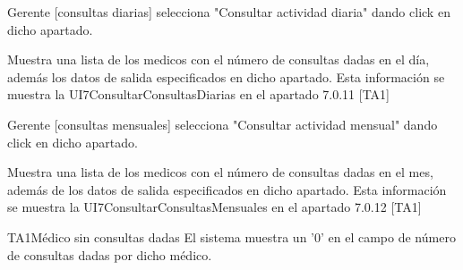 \begin{UCtrayectoria}{Gerente  [consultas diarias]}
        \UCpaso[\UCactor] selecciona "Consultar actividad diaria" dando click en dicho apartado.
        
        \UCpaso Muestra una lista de los medicos con el número de consultas dadas en el día, además los datos de salida especificados en dicho apartado. Esta información se muestra la UI7ConsultarConsultasDiarias   en el apartado 7.0.11 [TA1]

\end{UCtrayectoria}

\begin{UCtrayectoria}{Gerente  [consultas mensuales]}
        \UCpaso[\UCactor] selecciona "Consultar actividad mensual" dando click en dicho apartado.
        
        \UCpaso Muestra una lista de los medicos con el número de consultas dadas en el mes, además de los datos de salida especificados en dicho apartado. Esta información se muestra  la UI7ConsultarConsultasMensuales en el apartado 7.0.12 [TA1]

\end{UCtrayectoria}

\begin{UCtrayectoriaA}{TA1}{Médico sin consultas dadas}
    \UCpaso El sistema muestra un '0' en el campo de número de consultas dadas por dicho médico.
    
   \end{UCtrayectoriaA}
 
